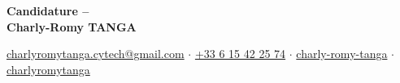 \begin{center}
    \textbf{\LARGE Candidature -- \targetRole{}}\\[0.2cm]
    \textbf{\large Charly-Romy TANGA}\\[0.2cm]
    \normalsize

    \href{mailto:charlyromytanga.cytech@gmail.com}{\faEnvelope[regular]\hspace{0.13cm}charlyromytanga.cytech@gmail.com}
    \quad$\cdot$\quad
    \href{tel:+33615422574}{\faPhone*\hspace{0.13cm}+33 6 15 42 25 74}
    \quad$\cdot$\quad
    \href{https://www.linkedin.com/in/charly-romy-tanga}{\faLinkedin\hspace{0.13cm}charly-romy-tanga}
    \quad$\cdot$\quad
    \href{https://github.com/charlyromytanga}{\faGithub\hspace{0.13cm}charlyromytanga}
\end{center}
